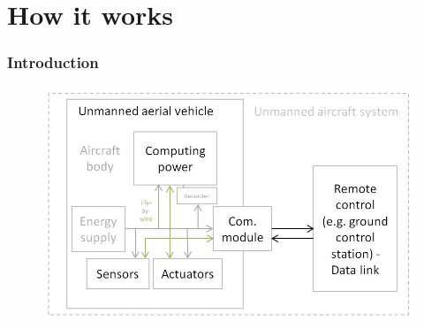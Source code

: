 \section{How it works}

\begin{frame}

\frametitle{Introduction}
\begin{figure}[H]
  \begin{center}
  \includegraphics[scale=0.45]{fig/uav_hardware.jpg}
  \end{center}
\end{figure}

\end{frame}




